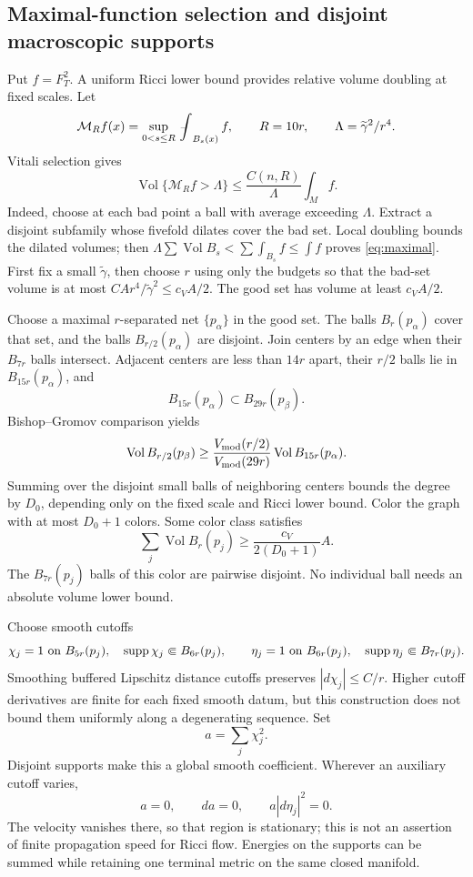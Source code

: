 \documentclass[a4paper,11pt]{article}
\numberwithin{equation}{section}
\theoremstyle{definition}
\newcommand{\Vol}{\operatorname{Vol}}
\newcommand{\fint}{\mathop{\rlap{\,\raisebox{0.1ex}{\tiny$-$}}\int}\nolimits}
\begin{document}
\subsection{Maximal-function selection and disjoint macroscopic supports}
Put $f=F_T^2$. A uniform Ricci lower bound provides relative volume doubling at fixed scales. Let
\[
\mathcal M_Rf(x)=\sup_{0<s\le R}\fint_{B_s(x)}f,\qquad
R=10r,\qquad \Lambda=\widetilde\gamma^2/r^4.
\]
Vitali selection gives
\begin{equation}\label{eq:maximal}
\Vol\{\mathcal M_Rf>\Lambda\}\le
\frac{C(n,R)}{\Lambda}\int_Mf.
\end{equation}
Indeed, choose at each bad point a ball with average exceeding $\Lambda$. Extract a disjoint subfamily whose fivefold dilates cover the bad set. Local doubling bounds the dilated volumes; then
$\Lambda\sum\Vol B_s<\sum\int_{B_s}f\le\int f$ proves \eqref{eq:maximal}.
First fix a small $\widetilde\gamma$, then choose $r$ using only the budgets so that the bad-set volume is at most
$CA r^4/\widetilde\gamma^2\le c_VA/2$. The good set has volume at least $c_VA/2$.

Choose a maximal $r$-separated net $\{p_\alpha\}$ in the good set. The balls $B_r(p_\alpha)$ cover that set, and the balls $B_{r/2}(p_\alpha)$ are disjoint. Join centers by an edge when their $B_{7r}$ balls intersect. Adjacent centers are less than $14r$ apart, their $r/2$ balls lie in $B_{15r}(p_\alpha)$, and
\[
B_{15r}(p_\alpha)\subset B_{29r}(p_\beta).
\]
Bishop--Gromov comparison yields
\[
\Vol B_{r/2}(p_\beta)\ge
\frac{V_{\rm mod}(r/2)}{V_{\rm mod}(29r)}
\Vol B_{15r}(p_\alpha).
\]
Summing over the disjoint small balls of neighboring centers bounds the degree by $D_0$, depending only on the fixed scale and Ricci lower bound. Color the graph with at most $D_0+1$ colors. Some color class satisfies
\[
\sum_j\Vol B_r(p_j)\ge\frac{c_V}{2(D_0+1)}A.
\]
The $B_{7r}(p_j)$ balls of this color are pairwise disjoint. No individual ball needs an absolute volume lower bound.

Choose smooth cutoffs
\[
\chi_j=1\ \hbox{on }B_{5r}(p_j),\quad
\operatorname{supp}\chi_j\Subset B_{6r}(p_j),\qquad
\eta_j=1\ \hbox{on }B_{6r}(p_j),\quad
\operatorname{supp}\eta_j\Subset B_{7r}(p_j).
\]
Smoothing buffered Lipschitz distance cutoffs preserves $|d\chi_j|\le C/r$. Higher cutoff derivatives are finite for each fixed smooth datum, but this construction does not bound them uniformly along a degenerating sequence. Set
\[
a=\sum_j\chi_j^2.
\]
Disjoint supports make this a global smooth coefficient. Wherever an auxiliary cutoff varies,
\[
a=0,\qquad da=0,\qquad a|d\eta_j|^2=0.
\]
The velocity vanishes there, so that region is stationary; this is not an assertion of finite propagation speed for Ricci flow. Energies on the supports can be summed while retaining one terminal metric on the same closed manifold.
\end{document}
